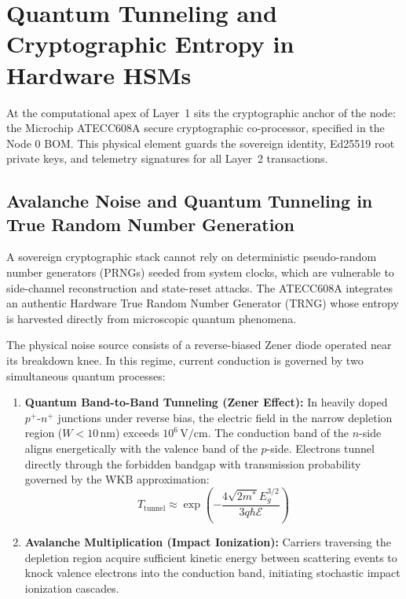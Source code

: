 \section{Quantum Tunneling and Cryptographic Entropy in Hardware HSMs}

At the computational apex of Layer~1 sits the cryptographic anchor of the node: the Microchip ATECC608A secure cryptographic co-processor, specified in the Node 0 BOM. This physical element guards the sovereign identity, Ed25519 root private keys, and telemetry signatures for all Layer~2 transactions.

\subsection{Avalanche Noise and Quantum Tunneling in True Random Number Generation}

A sovereign cryptographic stack cannot rely on deterministic pseudo-random number generators (PRNGs) seeded from system clocks, which are vulnerable to side-channel reconstruction and state-reset attacks. The ATECC608A integrates an authentic Hardware True Random Number Generator (TRNG) whose entropy is harvested directly from microscopic quantum phenomena.

The physical noise source consists of a reverse-biased Zener diode operated near its breakdown knee. In this regime, current conduction is governed by two simultaneous quantum processes:
\begin{enumerate}
    \item \textbf{Quantum Band-to-Band Tunneling (Zener Effect):} In heavily doped $p^+$-$n^+$ junctions under reverse bias, the electric field in the narrow depletion region ($W < 10\,\mathrm{nm}$) exceeds $10^6\,\mathrm{V/cm}$. The conduction band of the $n$-side aligns energetically with the valence band of the $p$-side. Electrons tunnel directly through the forbidden bandgap with transmission probability governed by the WKB approximation:
    \begin{equation}
    T_{\mathrm{tunnel}} \approx \exp\left( -\frac{4 \sqrt{2 m^*} E_g^{3/2}}{3 q \hbar \mathcal{E}} \right)
    \label{eq:wkb_tunneling}
    \end{equation}
    \item \textbf{Avalanche Multiplication (Impact Ionization):} Carriers traversing the depletion region acquire sufficient kinetic energy between scattering events to knock valence electrons into the conduction band, initiating stochastic impact ionization cascades.
\end{enumerate}

